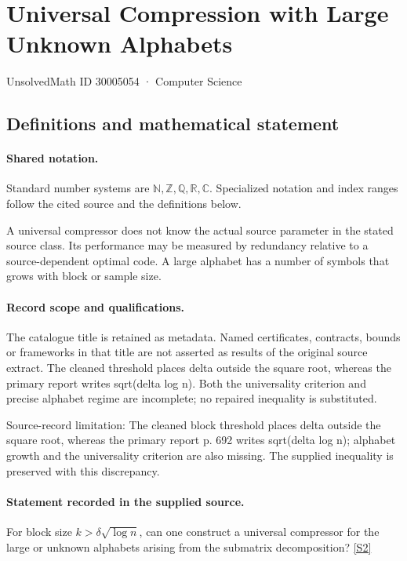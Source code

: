 \documentclass[11pt]{article}
\newcommand{\sref}[2]{\hyperlink{source:#1:#2}{[S#2]}}
\begin{document}
\setcounter{section}{30005053}
\section{Universal Compression with Large Unknown Alphabets}\label{30005054}
{\small\sffamily UnsolvedMath ID 30005054 · Computer Science}
\subsection{Definitions and mathematical statement}

\paragraph{Shared notation.}Standard number systems are $\mathbb N,\mathbb Z,\mathbb Q,\mathbb R,\mathbb C$. Specialized notation and index ranges follow the cited source and the definitions below.


A universal compressor does not know the actual source parameter in the stated source class. Its performance may be measured by redundancy relative to a source-dependent optimal code. A large alphabet has a number of symbols that grows with block or sample size.
\paragraph{Record scope and qualifications.}
The catalogue title is retained as metadata. Named certificates, contracts, bounds or frameworks in that title are not asserted as results of the original source extract.
The cleaned threshold places delta outside the square root, whereas the primary report writes sqrt(delta log n). Both the universality criterion and precise alphabet regime are incomplete; no repaired inequality is substituted.

Source-record limitation: The cleaned block threshold places delta outside the square root, whereas the primary report p. 692 writes sqrt(delta log n); alphabet growth and the universality criterion are also missing. The supplied inequality is preserved with this discrepancy.
\paragraph{Statement recorded in the supplied source.}
For block size $k>\delta\sqrt{\log n}$, can one construct a universal compressor for the large or unknown alphabets arising from the submatrix decomposition? \sref{30005054}{2}
\end{document}
